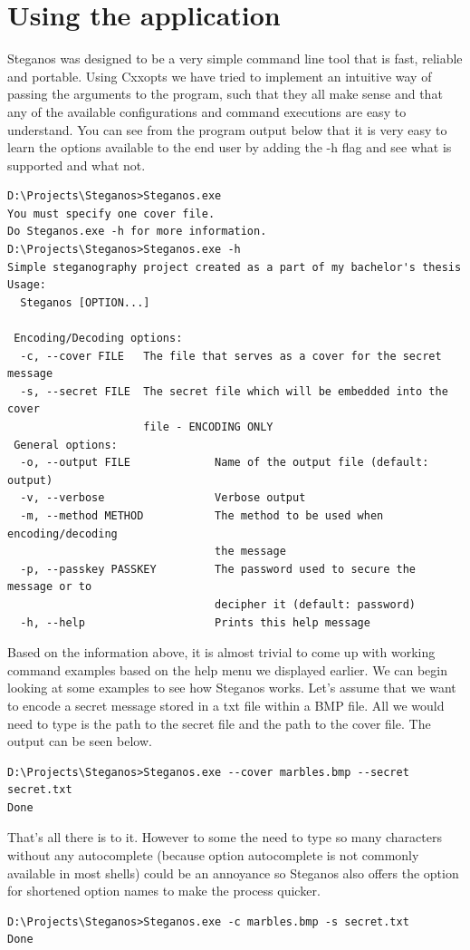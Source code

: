 \section{Using the application}
Steganos was designed to be a very simple command line tool that is fast, reliable and portable. Using Cxxopts we have tried to implement an intuitive way of passing the arguments to the program, such that they all make sense and that any of the available configurations and command executions are easy to understand. You can see from the program output below that it is very easy to learn the options available to the end user by adding the -h flag and see what is supported and what not.
\begin{verbatim}
D:\Projects\Steganos>Steganos.exe
You must specify one cover file.
Do Steganos.exe -h for more information.
D:\Projects\Steganos>Steganos.exe -h
Simple steganography project created as a part of my bachelor's thesis
Usage:
  Steganos [OPTION...]

 Encoding/Decoding options:
  -c, --cover FILE   The file that serves as a cover for the secret message
  -s, --secret FILE  The secret file which will be embedded into the cover
                     file - ENCODING ONLY
 General options:
  -o, --output FILE             Name of the output file (default: output)
  -v, --verbose                 Verbose output
  -m, --method METHOD           The method to be used when encoding/decoding
                                the message
  -p, --passkey PASSKEY         The password used to secure the message or to
                                decipher it (default: password)
  -h, --help                    Prints this help message
\end{verbatim}

Based on the information above, it is almost trivial to come up with working command examples based on the help menu we displayed earlier. We can begin looking at some examples to see how Steganos works. Let's assume that we want to encode a secret message stored in a txt file within a BMP file. All we would need to type is the path to the secret file and the path to the cover file. The output can be seen below.
\begin{verbatim}
D:\Projects\Steganos>Steganos.exe --cover marbles.bmp --secret secret.txt
Done
\end{verbatim}

That's all there is to it. However to some the need to type so many characters without any autocomplete (because option autocomplete is not commonly available in most shells) could be an annoyance so Steganos also offers the option for shortened option names to make the process quicker.
\begin{verbatim}
D:\Projects\Steganos>Steganos.exe -c marbles.bmp -s secret.txt
Done
\end{verbatim}

